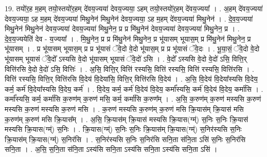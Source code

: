 \documentclass[17pt]{extarticle}
\begin{document}
19. तयो॑र॒ह म॒हम् तयो॒स्तयो॑र॒हम् दे॑वय॒ज्यया॑ देवय॒ज्यया॒ ऽहम् तयो॒स्तयो॑र॒हम् दे॑वय॒ज्यया᳚ । . अ॒हम् दे॑वय॒ज्यया॑ देवय॒ज्यया॒ ऽह म॒हम् दे॑वय॒ज्यया॑ मिथु॒नेन॑ मिथु॒नेन॑ देवय॒ज्यया॒ ऽह म॒हम् दे॑वय॒ज्यया॑ मिथु॒नेन॑ । . दे॒व॒य॒ज्यया॑ मिथु॒नेन॑ मिथु॒नेन॑ देवय॒ज्यया॑ देवय॒ज्यया॑ मिथु॒नेन॒ प्र प्र मि॑थु॒नेन॑ देवय॒ज्यया॑ देवय॒ज्यया॑ मिथु॒नेन॒ प्र । . दे॒व॒य॒ज्ययेति॑ देव - य॒ज्यया᳚ । . मि॒थु॒नेन॒ प्र प्र मि॑थु॒नेन॑ मिथु॒नेन॒ प्र भू॑यासम् भूयास॒म् प्र मि॑थु॒नेन॑ मिथु॒नेन॒ प्र भू॑यासम् । . प्र भू॑यासम् भूयास॒म् प्र प्र भू॑यासं ॅवे॒दो वे॒दो भू॑यास॒म् प्र प्र भू॑यासं ॅवे॒दः । . भू॒या॒सं॒ ॅवे॒दो वे॒दो भू॑यासम् भूयासं ॅवे॒दो᳚ ऽस्यसि वे॒दो भू॑यासम् भूयासं ॅवे॒दो॑ ऽसि । . वे॒दो᳚ ऽस्यसि वे॒दो वे॒दो॑ ऽसि॒ वित्ति॒र् वित्ति॑रसि वे॒दो वे॒दो॑ ऽसि॒ वित्तिः॑ । . अ॒सि॒ वित्ति॒र् वित्ति॑ रस्यसि॒ वित्ति॑ रस्यसि॒ वित्ति॑ रस्यसि॒ वित्ति॑रसि । . वित्ति॑ रस्यसि॒ वित्ति॒र् वित्ति॑रसि वि॒देय॑ वि॒देया॑सि॒ वित्ति॒र् वित्ति॑रसि वि॒देय॑ । . अ॒सि॒ वि॒देय॑ वि॒देया᳚स्यसि वि॒देय॒ कर्म॒ कर्म॑ वि॒देया᳚स्यसि वि॒देय॒ कर्म॑ । . वि॒देय॒ कर्म॒ कर्म॑ वि॒देय॑ वि॒देय॒ कर्मा᳚स्यसि॒ कर्म॑ वि॒देय॑ वि॒देय॒ कर्मा॑सि । . कर्मा᳚स्यसि॒ कर्म॒ कर्मा॑सि क॒रुण॑म् क॒रुण॑ मसि॒ कर्म॒ कर्मा॑सि क॒रुण᳚म् । . अ॒सि॒ क॒रुण॑म् क॒रुण॑ मस्यसि क॒रुण॑ मस्यसि क॒रुण॑ मस्यसि क॒रुण॑ मसि । . क॒रुण॑ मस्यसि क॒रुण॑म् क॒रुण॑ मसि क्रि॒यास॑म् क्रि॒यास॑ मसि क॒रुण॑म् क॒रुण॑ मसि क्रि॒यास᳚म् । . अ॒सि॒ क्रि॒यास॑म् क्रि॒यास॑ मस्यसि क्रि॒यास(ग्म्॑) स॒निः स॒निः क्रि॒यास॑ मस्यसि क्रि॒यास(ग्म्॑) स॒निः । . क्रि॒यास(ग्म्॑) स॒निः स॒निः क्रि॒यास॑म् क्रि॒यास(ग्म्॑) स॒निर॑स्यसि स॒निः क्रि॒यास॑म् क्रि॒यास(ग्म्॑) स॒निर॑सि । . स॒निर॑स्यसि स॒निः स॒निर॑सि सनि॒ता स॑नि॒ता ऽसि॑ स॒निः स॒निर॑सि सनि॒ता । . अ॒सि॒ स॒नि॒ता स॑नि॒ता ऽस्य॑सि सनि॒ता ऽस्य॑सि सनि॒ता ऽस्य॑सि सनि॒ता ऽसि॑ । \newline
\end{document}
